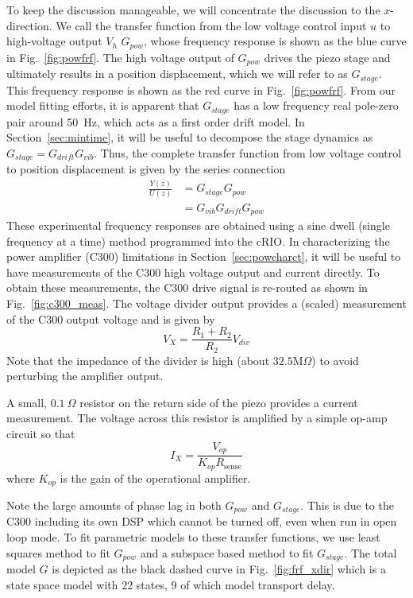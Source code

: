 \documentclass[journal,12pt,twocolumn,twoside]{IEEEtran/IEEEtran}
\begin{document}
To keep the discussion manageable, we will concentrate the discussion to the $x$-direction.
We call the transfer function from the low voltage control input $u$ to high-voltage output $V_{h}$ $G_{pow}$, whose frequency response is shown as the blue curve in Fig.~\ref{fig:powfrf}. The high voltage output of $G_{pow}$ drives the piezo stage and ultimately results in a position displacement, which we will refer to as $G_{stage}$. This frequency response is shown as the red curve in Fig.~\ref{fig:powfrf}. From our model fitting efforts, it is apparent that $G_{stage}$ has a low frequency real pole-zero pair around 50~Hz, which acts as a first order drift model. In Section~\ref{sec:mintime}, it will be useful to decompose the stage dynamics as $G_{stage} = G_{drift}G_{vib}$. 
Thus, the complete transfer function from low voltage control to position displacement is given by the series connection
\begin{align}
  \frac{Y(z)}{U(z)} &= G_{stage}G_{pow}\\
                    & =G_{vib}G_{drift}G_{pow}
\end{align}
These experimental frequency responses are obtained using a sine dwell (single frequency at a time) method programmed into the cRIO. In characterizing the power amplifier (C300) limitations in Section~\ref{sec:powcharct}, it will be useful to have measurements of the C300 high voltage output and current directly. To obtain these measurements, the C300 drive signal is re-routed as shown in Fig.~\ref{fig:c300_meas}. The voltage divider output provides a (scaled) measurement of the C300 output voltage and is given by
\begin{equation}
V_X = \frac{R_1 + R_2}{R_2}V_{div}
\end{equation}
Note that the impedance of the divider is high (about $32.5\text{M}\Omega$) to avoid perturbing the amplifier output.

 A small, $0.1~\Omega$ resistor on the return side of the piezo provides a current measurement. The voltage across this resistor is amplified by a simple op-amp circuit so that
\begin{equation}
I_{X} = \frac{V_{op}}{K_{op}R_{\text{sense}}}
\end{equation}
where $K_{op}$ is the gain of the operational amplifier.

Note the large amounts of phase lag in both $G_{pow}$ and $G_{stage}$. This is due to the C300 including its own DSP which cannot be turned off, even when run in open loop mode. To fit parametric models to these transfer functions, we use least squares method to fit $G_{pow}$ and a subspace based method to fit $G_{stage}$. 
The total model $G$ is depicted as the black dashed curve in Fig.~\ref{fig:frf_xdir} which is a state space model with 22 states, 9 of which model transport delay.
\end{document}
